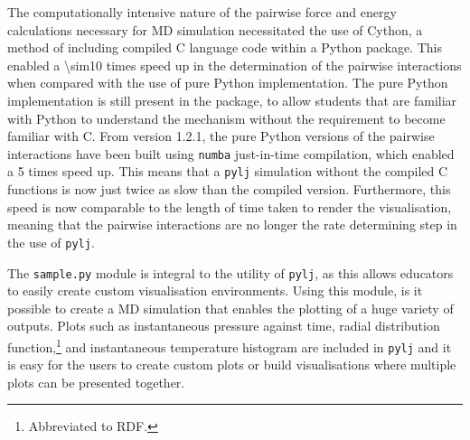The computationally intensive nature of the pairwise force and energy calculations necessary for MD simulation necessitated the use of Cython, a method of including compiled C language code within a Python package.\autocite{noauthor_cython_nodate}
This enabled a \num{\sim10} times speed up in the determination of the pairwise interactions when compared with the use of pure Python implementation.
The pure Python implementation is still present in the package, to allow students that are familiar with Python to understand the mechanism without the requirement to become familiar with C.
From version 1.2.1,\autocite{mccluskey_arm61/pylj_2019-1} the pure Python versions of the pairwise interactions have been built using \texttt{numba} just-in-time compilation,\autocite{noauthor_numba_nodate} which enabled a \num{5} times speed up.
This means that a \texttt{pylj} simulation without the compiled C functions is now just twice as slow than the compiled version.
Furthermore, this speed is now comparable to the length of time taken to render the visualisation, meaning that the pairwise interactions are no longer the rate determining step in the use of \texttt{pylj}.

The \texttt{sample.py} module is integral to the utility of \texttt{pylj}, as this allows educators to easily create custom visualisation environments.
Using this module, is it possible to create a MD simulation that enables the plotting of a huge variety of outputs.
Plots such as instantaneous pressure against time, radial distribution function,\footnote{Abbreviated to RDF.}  and instantaneous temperature histogram are included in \texttt{pylj} and it is easy for the users to create custom plots or build visualisations where multiple plots can be presented together.

